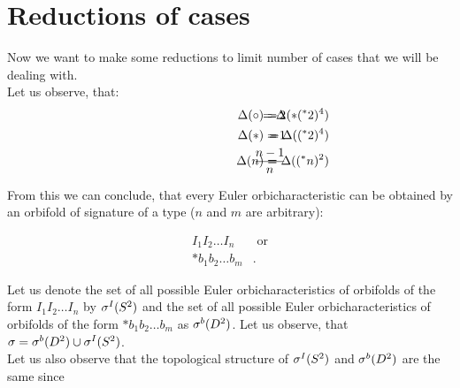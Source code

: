 


\section{Reductions of cases}
Now we want to make some reductions to limit number of cases that we will be dealing with. \\
Let us observe, that:
\begin{align*}
\hspace{3cm}\Delta(\circ) =& \hspace{-1cm} &-2& \hspace{-1cm} &= \Delta(*(^*2)^4) \\
\hspace{3cm}\Delta(*) =& \hspace{-1cm} &-1& \hspace{-1cm} &= \Delta((^*2)^4) \\
\hspace{3cm}\Delta(n) =& \hspace{-1cm} &\frac{n-1}{n}& \hspace{-1cm} &= \Delta((^*n)^2)
\end{align*}

From this we can conclude, that every Euler orbicharacteristic can be obtained 
by an orbifold of signature of a type ($n$ and $m$ are arbitrary):

\begin{align*}
I_1I_2\dots I_n & \textrm{\ or} \\
*b_1b_2\dots b_m &.
\end{align*}

Let us denote the set of all possible Euler orbicharacteristics of orbifolds of the form 
$I_1I_2\dots I_n$ by ${\mathcal{\sigma}^I(S^2)}$ and the set 
of all possible Euler orbicharacteristics of orbifolds of the form $*b_1b_2\dots b_m$ 
as ${\mathcal{\sigma}^b(D^2)}$. 
Let us observe, that $\sigma = {\mathcal{\sigma}^b(D^2)} \cup {\mathcal{\sigma}^I(S^2)}$. \\
Let us also observe that the topological structure of ${\mathcal{\sigma}^I(S^2)}$ and ${\mathcal{\sigma}^b(D^2)}$ are the same since 

